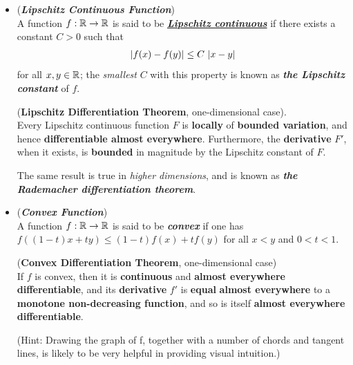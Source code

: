 \documentclass[11pt]{article}
\begin{document}
\begin{itemize}
\item \begin{definition} (\emph{\textbf{Lipschitz Continuous Function}})\\
A function $f : {\mathbb R} \rightarrow {\mathbb R}$ is said to be \underline{\emph{\textbf{Lipschitz continuous}}} if there exists a constant $C > 0$ such that
\begin{align*}
\left\lvert f(x) - f(y) \right\rvert \le C\,\left\lvert x - y \right\rvert 
\end{align*} for all $x, y \in {\mathbb R}$; the \emph{smallest} $C$ with this property is known as \emph{\textbf{the Lipschitz constant}} of $f$.
\end{definition}

\begin{corollary}  (\textbf{Lipschitz Differentiation Theorem}, one-dimensional case). \\
Every Lipschitz continuous function $F$ is \textbf{locally} of \textbf{bounded variation}, and hence \textbf{differentiable almost everywhere}. Furthermore,  the \textbf{derivative} $F'$, when it exists, is \textbf{bounded} in magnitude by the Lipschitz constant of $F$.
\end{corollary}

\begin{remark}
The same result is true in \emph{higher dimensions}, and is known as \emph{\textbf{the Rademacher differentiation theorem}}.
\end{remark}

\item \begin{definition} (\emph{\textbf{Convex Function}})\\
A function $f : {\mathbb R} \rightarrow {\mathbb R}$  is said to be \emph{\textbf{convex}} if one has $f((1- t)x + ty) \le (1- t)f(x) + tf(y)$ for all $x < y$ and $0 < t < 1$.
\end{definition}

\begin{corollary} (\textbf{Convex Differentiation Theorem}, one-dimensional case)\\
If $f$ is convex, then it is \textbf{continuous} and \textbf{almost everywhere differentiable}, and its \textbf{derivative} $f'$ is \textbf{equal} \textbf{almost everywhere} to a \textbf{monotone non-decreasing function}, and so is itself \textbf{almost everywhere differentiable}. 
\end{corollary} (Hint: Drawing the graph of f, together with a number of chords and tangent lines, is likely to be very helpful in providing
visual intuition.) 


\end{itemize}
\end{document}
